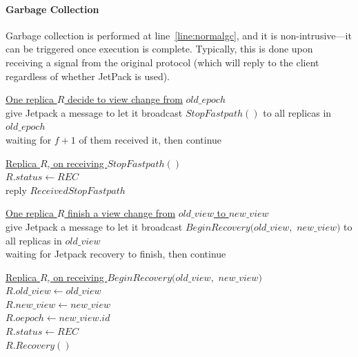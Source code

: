 \documentclass[twocolumn]{article}
\begin{document}
\paragraph{Garbage Collection} 
Garbage collection is performed at line~\ref{line:normalgc}, and it is non-intrusive—it can be triggered once execution is complete. Typically, this is done upon receiving a signal from the original protocol (which will reply to the client regardless of whether JetPack is used).

\begin{algorithm}
\caption{Original - Start View Change}
    \label{alg:start_view_change}
    \setcounter{AlgoLine}{41}
    \underline{One replica $R$ decide to view change from}
    \underline{$old\_epoch$}\label{line:finishrecoverybegin}\\
    give Jetpack a message to let it broadcast $StopFastpath()$ to all replicas in $old\_epoch$\label{line:broadcastfinishrecovery}\\
    waiting for $f+1$ of them received it, then continue\\
    
    \vskip 10pt
    
    \underline{Replica $R$, on receiving $StopFastpath()$}\\
    $R.status\gets REC$\\
    reply $ReceivedStopFastpath$\\
\end{algorithm}

\begin{algorithm}
\caption{Original - Finish View Change}
    \label{alg:finish_view_change}
    \setcounter{AlgoLine}{47}
    \underline{One replica $R$ finish a view change from}
    \underline{$old\_view$ to $new\_view$}\label{line:finishrecoverybegin}\\
    give Jetpack a message to let it broadcast $BeginRecovery(old\_view,$ $new\_view)$ to all replicas in $old\_view$\label{line:broadcastfinishrecovery}\\
    waiting for Jetpack recovery to finish, then continue\\
    
    \vskip 10pt
    
    \underline{Replica $R$, on receiving $BeginRecovery(old\_view, $}
    \underline{$new\_view)$}\\
    $R.old\_view\gets old\_view$\\
    $R.new\_view\gets new\_view$\label{line:updateview}\\
    $R.oepoch\gets new\_view.id$\label{line:normalrequestdisabledsettrue}\\
    $R.status\gets REC$\\
    $R.Recovery()$\\
\end{algorithm}
\end{document}
